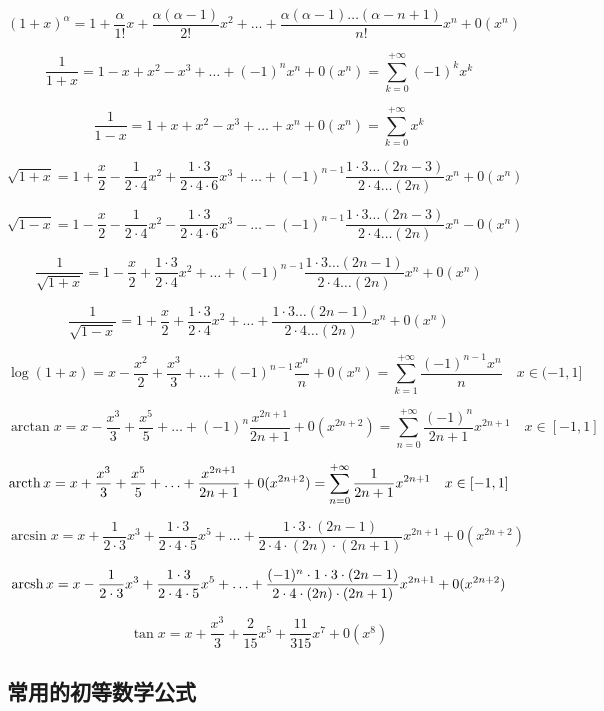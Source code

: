 \documentclass{article}
\begin{document}
$$
(1+x)^\alpha = 1+\frac{ \alpha}{1!}x + \frac{ \alpha(\alpha-1)}{2!}x^2
+\ldots+
\frac{ \alpha(\alpha-1)\ldots(\alpha-n+1)}{n!}x^n+
0(x^n)
$$

$$
\frac{ 1}{1+x}= 1 -x +x^2-x^3+\ldots +(-1)^n x^n +0(x^n)=\sum_{k=0}^{+\infty}(-1)^kx^k
$$

$$
\frac{ 1}{1-x}= 1 +x +x^2-x^3+\ldots +x^n +0(x^n)=\sum_{k=0}^{+\infty}x^k
$$

$$
\sqrt{1+x}= 1+\frac{ x}{2}-\frac{ 1}{2\cdot 4}x^2+ \frac{ 1\cdot3}{2\cdot4\cdot6}x^3
+\ldots+
(-1)^{n-1} \frac{1\cdot3\ldots(2n-3)}{2\cdot4\ldots(2n)}x^n +0(x^n)
$$

$$
\sqrt{1-x}= 1-\frac{ x}{2}-\frac{ 1}{2\cdot 4}x^2- \frac{ 1\cdot3}{2\cdot4\cdot6}x^3
-\ldots-
(-1)^{n-1} \frac{1\cdot3\ldots(2n-3)}{2\cdot4\ldots(2n)}x^n -0(x^n)
$$

$$
\frac{ 1}{\sqrt{1+x}}
= 1-\frac{ x}{2}+\frac{ 1\cdot3}{2\cdot 4}x^2
+\ldots+
(-1)^{n-1} \frac{1\cdot3\ldots(2n-1)}{2\cdot4\ldots(2n)}x^n +0(x^n)
$$

$$
\frac{ 1}{\sqrt{1-x}}
= 1+\frac{ x}{2}+\frac{ 1\cdot3}{2\cdot 4}x^2
+\ldots+
\frac{1\cdot3\ldots(2n-1)}{2\cdot4\ldots(2n)}x^n +0(x^n)
$$

$$
\log (1+x)=
x-\frac{ x^2}{2}+\frac{ x^3}{3}+\ldots+ (-1)^{n-1} \frac{ x^n}{n}+0(x^n)
=\sum_{k=1}^{+\infty}\frac{(-1)^{n-1}x^n}{n}
\quad x\in(-1,1]
$$

$$
\arctan x=x-\frac{ x^3}{3}+\frac{ x^5}{5}+\ldots+ (-1)^n \frac{x^{2n+1}}{2n+1}+
0(x^{2n+2})
=
\sum_{n=0}^{+\infty} \frac{(-1)^n}{2n+1} x^{2n+1}
\quad x\in[-1,1]
$$

$$
\operatorname{arcth} x=x+\frac{ x^3}{3}+\frac{ x^5}{5}+\ldots+ \frac{x^{2n+1}}{2n+1}+
0(x^{2n+2})
=
\sum_{n=0}^{+\infty} \frac{1}{2n+1} x^{2n+1}
\quad x\in[-1,1]
$$


$$
\arcsin x=
x+ \frac{ 1}{2\cdot3}x^3+\frac{1\cdot3}{2\cdot4\cdot5}x^5
+\ldots+
\frac{ 1\cdot3\cdot(2n-1)}{2\cdot4\cdot(2n)\cdot(2n+1)}x^{2n+1}+0(x^{2n+2})
$$

$$
\operatorname{arcsh} x=
x-\frac{ 1}{2\cdot3}x^3+\frac{1\cdot3}{2\cdot4\cdot5}x^5
+\ldots+
\frac{ (-1)^n \cdot1\cdot3\cdot(2n-1)}{2\cdot4\cdot(2n)\cdot(2n+1)}x^{2n+1}+0(x^{2n+2})
$$

$$
\tan x=
x+\frac{ x^3}{3}+\frac{2}{15}x^5+\frac{ 11}{315}x^7+0(x^8)
$$


\subsection{常用的初等数学公式}
\end{document}
